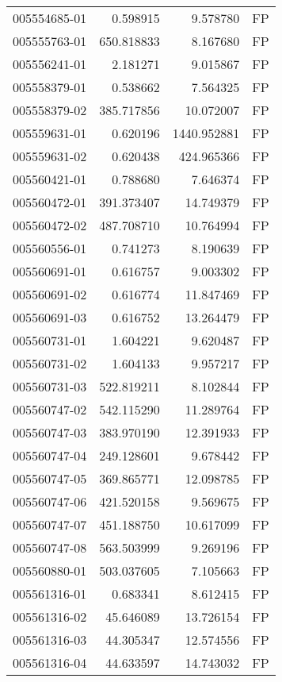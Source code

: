 \begin{tabular}{lrrl}
005554685-01 &    0.598915 &     9.578780 &   FP \\
005555763-01 &  650.818833 &     8.167680 &   FP \\
005556241-01 &    2.181271 &     9.015867 &   FP \\
005558379-01 &    0.538662 &     7.564325 &   FP \\
005558379-02 &  385.717856 &    10.072007 &   FP \\
005559631-01 &    0.620196 &  1440.952881 &   FP \\
005559631-02 &    0.620438 &   424.965366 &   FP \\
005560421-01 &    0.788680 &     7.646374 &   FP \\
005560472-01 &  391.373407 &    14.749379 &   FP \\
005560472-02 &  487.708710 &    10.764994 &   FP \\
005560556-01 &    0.741273 &     8.190639 &   FP \\
005560691-01 &    0.616757 &     9.003302 &   FP \\
005560691-02 &    0.616774 &    11.847469 &   FP \\
005560691-03 &    0.616752 &    13.264479 &   FP \\
005560731-01 &    1.604221 &     9.620487 &   FP \\
005560731-02 &    1.604133 &     9.957217 &   FP \\
005560731-03 &  522.819211 &     8.102844 &   FP \\
005560747-02 &  542.115290 &    11.289764 &   FP \\
005560747-03 &  383.970190 &    12.391933 &   FP \\
005560747-04 &  249.128601 &     9.678442 &   FP \\
005560747-05 &  369.865771 &    12.098785 &   FP \\
005560747-06 &  421.520158 &     9.569675 &   FP \\
005560747-07 &  451.188750 &    10.617099 &   FP \\
005560747-08 &  563.503999 &     9.269196 &   FP \\
005560880-01 &  503.037605 &     7.105663 &   FP \\
005561316-01 &    0.683341 &     8.612415 &   FP \\
005561316-02 &   45.646089 &    13.726154 &   FP \\
005561316-03 &   44.305347 &    12.574556 &   FP \\
005561316-04 &   44.633597 &    14.743032 &   FP \\

\end{tabular}
